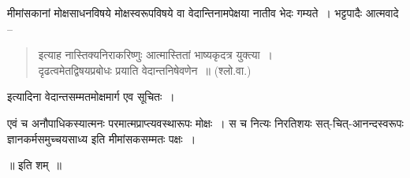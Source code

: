 {मीमांसकानां मोक्षसाधनविषये मोक्षस्वरूपविषये वा वेदान्तिनामपेक्षया नातीव भेदः गम्यते~। भट्टपादैः आत्मवादे –
\begin{verse}
इत्याह नास्तिक्यनिराकरिष्णुः आत्मास्तितां भाष्यकृदत्र युक्त्या~। \\
दृढत्वमेतद्विषयप्रबोधः प्रयाति वेदान्तनिषेवणेन~॥ (श्लो.वा.)
\end{verse}
इत्यादिना वेदान्तसम्मतमोक्षमार्ग एव सूचितः~। 

एवं च अनौपाधिकस्यात्मनः परमात्मप्राप्त्यवस्थारूपः मोक्षः~। स च नित्यः निरतिशयः सत्-चित्-आनन्दस्वरूपः ज्ञानकर्मसमुच्चयसाध्य इति मीमांसकसम्मतः पक्षः~। 
\bigskip

\centerline{॥ इति शम्~॥}

\articleend
}
